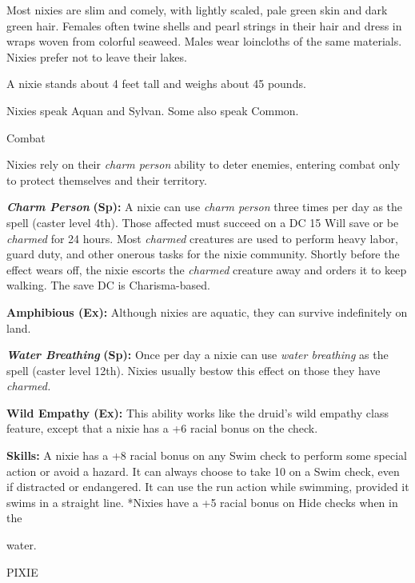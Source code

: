 \documentclass{article}
\begin{document}
Most nixies are slim and comely, with lightly scaled, pale green skin and dark 
green hair. Females often twine shells and pearl strings in their hair and dress 
in wraps woven from colorful seaweed. Males wear loincloths of the same materials. 
Nixies prefer not to leave their lakes.

A nixie stands about 4 feet tall and weighs about 45 pounds.

Nixies speak Aquan and Sylvan. Some also speak Common.

Combat

Nixies rely on their \textit{charm person }ability to deter enemies, entering combat 
only to protect themselves and their territory.

\textit{\textbf{Charm Person }}\textbf{(Sp): }A nixie can use \textit{charm person 
}three times per day as the spell (caster level 4th). Those affected must succeed 
on a DC 15 Will save or be \textit{charmed }for 24 hours. Most \textit{charmed 
}creatures are used to perform heavy labor, guard duty, and other onerous tasks 
for the nixie community. Shortly before the effect wears off, the nixie escorts 
the \textit{charmed }creature away and orders it to keep walking. The save DC is 
Charisma-based.

\textbf{Amphibious (Ex): }Although nixies are aquatic, they can survive indefinitely 
on land.

\textit{\textbf{Water Breathing }}\textbf{(Sp): }Once per day a nixie can use \textit{water 
breathing }as the spell (caster level 12th). Nixies usually bestow this effect 
on those they have \textit{charmed.}

\textbf{Wild Empathy (Ex): }This ability works like the druid's wild empathy class 
feature, except that a nixie has a +6 racial bonus on the check.

\textbf{Skills:} A nixie has a +8 racial bonus on any Swim check to perform some 
special action or avoid a hazard. It can always choose to take 10 on a Swim check, 
even if distracted or endangered. It can use the run action while swimming, provided 
it swims in a straight line. *Nixies have a +5 racial bonus on Hide checks when 
in the

water.

\vspace{12pt}
PIXIE
\end{document}
